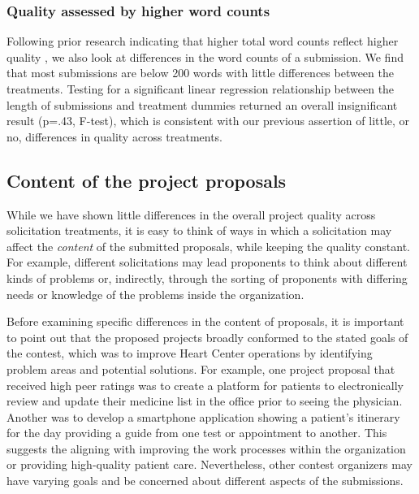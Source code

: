 \documentclass[11pt]{article}
\begin{document}
\subsubsection{Quality assessed by higher word
counts}\label{quality-assessed-by-higher-word-counts}

Following prior research indicating that higher total word counts
reflect higher quality \citep{blumenstock2008size}, we also look at
differences in the word counts of a submission. We find that most
submissions are below 200 words with little differences between the
treatments. Testing for a significant linear regression relationship
between the length of submissions and treatment dummies returned an
overall insignificant result (p=.43, F-test), which is consistent with
our previous assertion of little, or no, differences in quality across
treatments.

\subsection{Content of the project
proposals}\label{content-of-the-project-proposals}

While we have shown little differences in the overall project quality
across solicitation treatments, it is easy to think of ways in which a
solicitation may affect the \emph{content} of the submitted proposals,
while keeping the quality constant. For example, different solicitations
may lead proponents to think about different kinds of problems or,
indirectly, through the sorting of proponents with differing needs or
knowledge of the problems inside the organization.

Before examining specific differences in the content of proposals, it is
important to point out that the proposed projects broadly conformed to
the stated goals of the contest, which was to improve Heart Center
operations by identifying problem areas and potential solutions. For
example, one project proposal that received high peer ratings was to
create a platform for patients to electronically review and update their
medicine list in the office prior to seeing the physician. Another was
to develop a smartphone application showing a patient's itinerary for
the day providing a guide from one test or appointment to another. This
suggests the aligning with improving the work processes within the
organization or providing high-quality patient care. Nevertheless, other
contest organizers may have varying goals and be concerned about
different aspects of the submissions.
\end{document}
